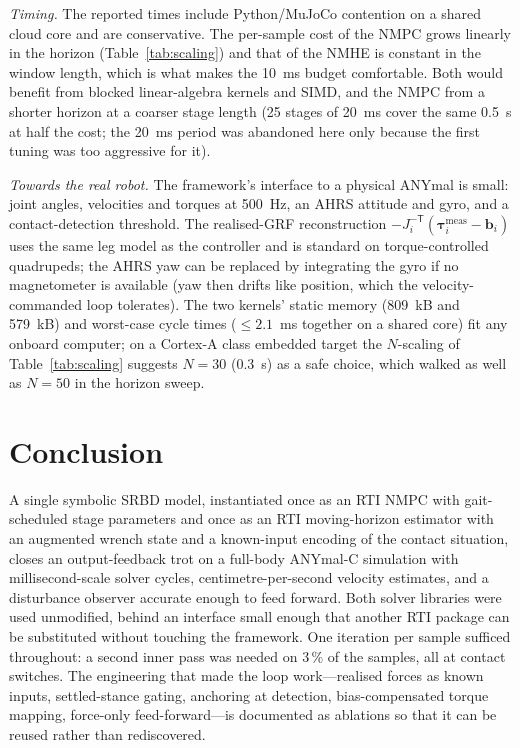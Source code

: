 \documentclass[11pt]{article}
\begin{document}
\emph{Timing.} The reported times include Python/MuJoCo contention on a shared cloud core and are conservative. The per-sample cost of the NMPC grows linearly in the horizon (Table~\ref{tab:scaling}) and that of the NMHE is constant in the window length, which is what makes the 10~ms budget comfortable. Both would benefit from blocked linear-algebra kernels and SIMD, and the NMPC from a shorter horizon at a coarser stage length (25 stages of 20~ms cover the same 0.5~s at half the cost; the 20~ms period was abandoned here only because the first tuning was too aggressive for it).

\emph{Towards the real robot.} The framework's interface to a physical ANYmal is small: joint angles, velocities and torques at 500~Hz, an AHRS attitude and gyro, and a contact-detection threshold. The realised-GRF reconstruction $-J_i^{-\mathsf T}(\bm\tau^{\mathrm{meas}}_i-\bm b_i)$ uses the same leg model as the controller and is standard on torque-controlled quadrupeds; the AHRS yaw can be replaced by integrating the gyro if no magnetometer is available (yaw then drifts like position, which the velocity-commanded loop tolerates). The two kernels' static memory (809~kB and 579~kB) and worst-case cycle times ($\le2.1$~ms together on a shared core) fit any onboard computer; on a Cortex-A class embedded target the $N$-scaling of Table~\ref{tab:scaling} suggests $N=30$ (0.3~s) as a safe choice, which walked as well as $N=50$ in the horizon sweep.

\section{Conclusion}
A single symbolic SRBD model, instantiated once as an RTI NMPC with gait-scheduled stage parameters and once as an RTI moving-horizon estimator with an augmented wrench state and a known-input encoding of the contact situation, closes an output-feedback trot on a full-body ANYmal-C simulation with millisecond-scale solver cycles, centimetre-per-second velocity estimates, and a disturbance observer accurate enough to feed forward. Both solver libraries were used unmodified, behind an interface small enough that another RTI package can be substituted without touching the framework. One iteration per sample sufficed throughout: a second inner pass was needed on 3\,\% of the samples, all at contact switches. The engineering that made the loop work---realised forces as known inputs, settled-stance gating, anchoring at detection, bias-compensated torque mapping, force-only feed-forward---is documented as ablations so that it can be reused rather than rediscovered.
\end{document}
